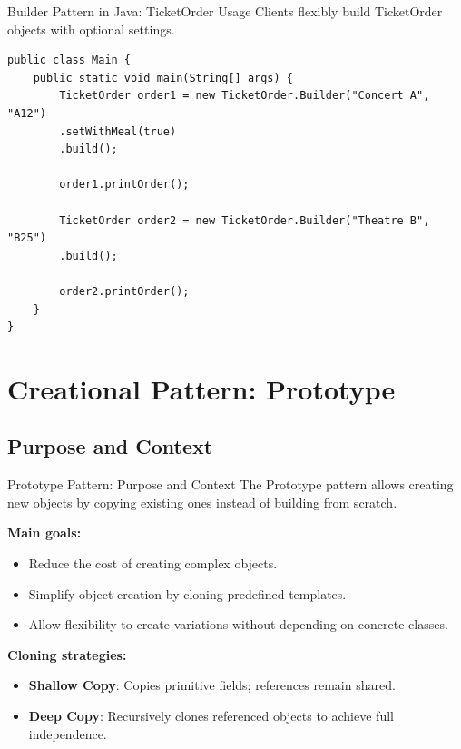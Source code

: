 \documentclass[aspectratio=169, table]{beamer}
\begin{document}
\begin{frame}[fragile]{Builder Pattern in Java: TicketOrder Usage}
\vspace{20pt}
Clients flexibly build TicketOrder objects with optional settings.

\begin{lstlisting}[style=JavaStyle]
public class Main {
	public static void main(String[] args) {
		TicketOrder order1 = new TicketOrder.Builder("Concert A", "A12")
		.setWithMeal(true)
		.build();
		
		order1.printOrder();
		
		TicketOrder order2 = new TicketOrder.Builder("Theatre B", "B25")
		.build();
		
		order2.printOrder();
	}
}
\end{lstlisting}
\end{frame}

\section{Creational Pattern: Prototype}

\subsection{Purpose and Context}

\begin{frame}[fragile]{Prototype Pattern: Purpose and Context}
	\vspace{20pt}
	The Prototype pattern allows creating new objects by copying existing ones instead of building from scratch.
	
	\vspace{10pt}
	\textbf{Main goals:}
	\begin{itemize}
		\item Reduce the cost of creating complex objects.
		\item Simplify object creation by cloning predefined templates.
		\item Allow flexibility to create variations without depending on concrete classes.
	\end{itemize}
	
	\vspace{5pt}
	\textbf{Cloning strategies:}
	\begin{itemize}
		\item \textbf{Shallow Copy}: Copies primitive fields; references remain shared.
		\item \textbf{Deep Copy}: Recursively clones referenced objects to achieve full independence.
	\end{itemize}
\end{frame}
\end{document}
